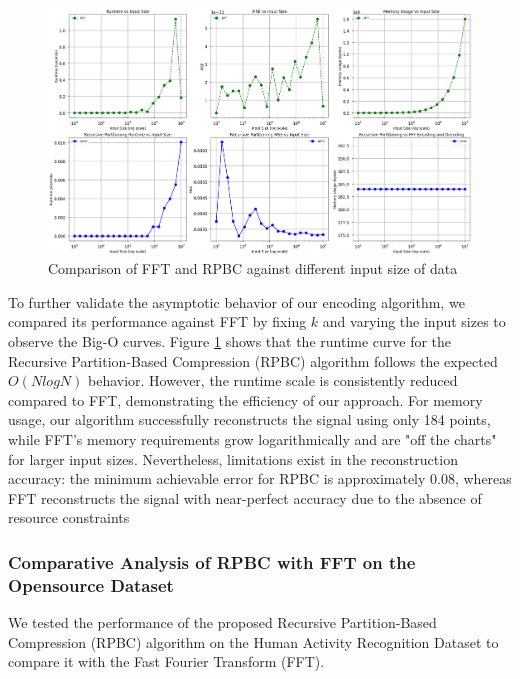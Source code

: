 \documentclass[onecolumn,conference]{IEEEtran}
\begin{document}
\begin{figure}[!h]
    \centering
    \includegraphics[width=1\linewidth, height=1\linewidth,keepaspectratio]{images/Experiment 1 Part b.png}
    \caption{Comparison of FFT and RPBC against different input size of data}
    \label{fig:1_part_b}
\end{figure}
To further validate the asymptotic behavior of our encoding algorithm, we compared its performance against FFT by fixing $k$ and varying the input sizes to observe the Big-O curves. Figure \ref{fig:1_part_b} shows that the runtime curve for the Recursive Partition-Based Compression (RPBC) algorithm follows the expected $O (NlogN)$ behavior. However, the runtime scale is consistently reduced compared to FFT, demonstrating the efficiency of our approach. For memory usage, our algorithm successfully reconstructs the signal using only 184 points, while FFT's memory requirements grow logarithmically and are "off the charts" for larger input sizes. Nevertheless, limitations exist in the reconstruction accuracy: the minimum achievable error for RPBC is approximately 0.08, whereas FFT reconstructs the signal with near-perfect accuracy due to the absence of resource constraints
\subsubsection{Comparative Analysis of RPBC with FFT on the Opensource Dataset}
We tested the performance of the proposed Recursive Partition-Based Compression (RPBC) algorithm on the Human Activity Recognition Dataset \cite{Anguita2013APD} to compare it with the Fast Fourier Transform (FFT).
\end{document}

